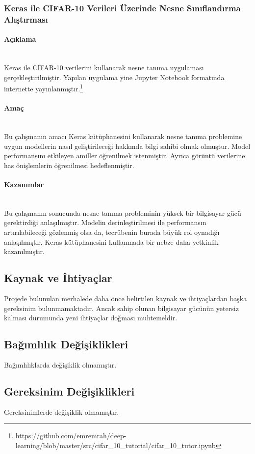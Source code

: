\documentclass[12pt,a4paper]{article}
\newcommand{\subsubsubsection}[1]{\paragraph{#1}\mbox{}\\}
\begin{document}
    \subsubsection{Keras ile CIFAR-10 Verileri Üzerinde Nesne Sınıflandırma Alıştırması}
    \subsubsubsection{Açıklama}
    Keras ile CIFAR-10 verilerini kullanarak nesne tanıma uygulaması gerçekleştirilmiştir.
    Yapılan uygulama yine Jupyter Notebook formatında internette yayınlanmıştır.\footnote{https://github.com/emremrah/deep-learning/blob/master/src/cifar\_10\_tutorial/cifar\_10\_tutor.ipynb}

    \subsubsubsection{Amaç}
    Bu çalışmanın amacı Keras kütüphanesini kullanarak nesne tanıma problemine uygun modellerin nasıl geliştirileceği hakkında bilgi sahibi olmak olmuştur.
    Model performansını etkileyen amiller öğrenilmek istenmiştir. Ayrıca görüntü verilerine has önişlemlerin öğrenilmesi hedeflenmiştir.

    \subsubsubsection{Kazanımlar}
    Bu çalışmanın sonucunda nesne tanıma probleminin yüksek bir bilgisayar gücü gerektirdiği anlaşılmıştır.
    Modelin derinleştirilmesi ile performansın artırılabileceği gözlenmiş olsa da, tecrübenin burada büyük rol oynadığı anlaşılmıştır.
    Keras kütüphanesini kullanmada bir nebze daha yetkinlik kazanılmıştır.

    \subsection{Kaynak ve İhtiyaçlar}
    Projede bulunulan merhalede daha önce belirtilen kaynak ve ihtiyaçlardan başka gereksinim bulunmamaktadır. Ancak sahip olunan bilgisayar gücünün yetersiz
    kalması durumunda yeni ihtiyaçlar doğması muhtemeldir.

    \subsection{Bağımlılık Değişiklikleri}
    Bağımlılıklarda değişiklik olmamıştır.

    \subsection{Gereksinim Değişiklikleri}
    Gereksinimlerde değişiklik olmamıştır.
\end{document}
